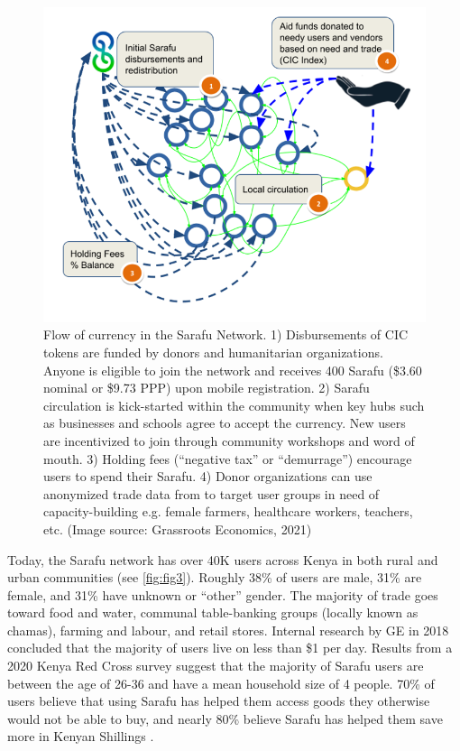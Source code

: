 \documentclass[12pt]{article}
\begin{document}
\begin{figure}[hp]
    \centering
    \includegraphics[width=.8\textwidth]{figures/fig_1}
    \caption{Flow of currency in the Sarafu Network. 1) Disbursements of CIC tokens are funded by donors and humanitarian organizations. Anyone is eligible to join the network and receives 400 Sarafu (\$3.60 nominal or \$9.73 PPP) upon mobile registration. 2) Sarafu circulation is kick-started within the community when key hubs such as businesses and schools agree to accept the currency. New users are incentivized to join through community workshops and word of mouth. 3) Holding fees (“negative tax” or “demurrage”) encourage users to spend their Sarafu. 4) Donor organizations can use anonymized trade data from to target user groups in need of capacity-building e.g. female farmers, healthcare workers, teachers, etc. (Image source: Grassroots Economics, 2021)}
    \label{fig:fig1}
\end{figure}


Today, the Sarafu network has over 40K users across Kenya in both rural and urban communities (see \autoref{fig:fig3}). Roughly 38\% of users are male, 31\% are female, and 31\% have unknown or “other” gender. The majority of trade goes toward food and water, communal table-banking groups (locally known as chamas), farming and labour, and retail stores. Internal research by GE in 2018 concluded that the majority of users live on less than \$1 per day. Results from a 2020 Kenya Red Cross survey suggest that the majority of Sarafu users are between the age of 26-36 and have a mean household size of 4 people. 70\% of users believe that using Sarafu has helped them access goods they otherwise would not be able to buy, and nearly 80\% believe Sarafu has helped them save more in Kenyan Shillings \citep{Kenya2020}.
\end{document}
